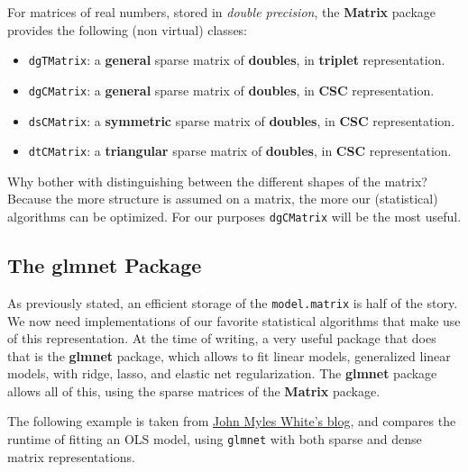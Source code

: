 \documentclass[]{book}
\providecommand{\tightlist}{%
  \setlength{\itemsep}{0pt}\setlength{\parskip}{0pt}}
\theoremstyle{definition}
\theoremstyle{definition}
\theoremstyle{definition}
\theoremstyle{remark}
\begin{document}
For matrices of real numbers, stored in \emph{double precision}, the
\textbf{Matrix} package provides the following (non virtual) classes:

\begin{itemize}
\tightlist
\item
  \texttt{dgTMatrix}: a \textbf{general} sparse matrix of
  \textbf{doubles}, in \textbf{triplet} representation.
\item
  \texttt{dgCMatrix}: a \textbf{general} sparse matrix of
  \textbf{doubles}, in \textbf{CSC} representation.
\item
  \texttt{dsCMatrix}: a \textbf{symmetric} sparse matrix of
  \textbf{doubles}, in \textbf{CSC} representation.
\item
  \texttt{dtCMatrix}: a \textbf{triangular} sparse matrix of
  \textbf{doubles}, in \textbf{CSC} representation.
\end{itemize}

Why bother with distinguishing between the different shapes of the
matrix? Because the more structure is assumed on a matrix, the more our
(statistical) algorithms can be optimized. For our purposes
\texttt{dgCMatrix} will be the most useful.

\subsection{The glmnet Package}\label{the-glmnet-package}

As previously stated, an efficient storage of the \texttt{model.matrix}
is half of the story. We now need implementations of our favorite
statistical algorithms that make use of this representation. At the time
of writing, a very useful package that does that is the \textbf{glmnet}
package, which allows to fit linear models, generalized linear models,
with ridge, lasso, and elastic net regularization. The \textbf{glmnet}
package allows all of this, using the sparse matrices of the
\textbf{Matrix} package.

The following example is taken from
\href{http://www.johnmyleswhite.com/notebook/2011/10/31/using-sparse-matrices-in-r/}{John
Myles White's blog}, and compares the runtime of fitting an OLS model,
using \texttt{glmnet} with both sparse and dense matrix representations.
\end{document}
